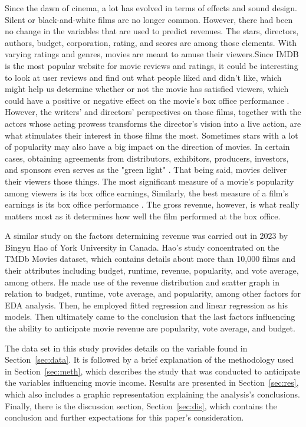 \documentclass[12pt]{article}
\begin{document}
Since the dawn of cinema, a lot has evolved in terms of effects and sound design. 
Silent or black-and-white films are no longer common. However, there had been no
change in the variables that are used to predict revenues. The stars, directors,
authors, budget, corporation, rating, and scores are among those elements. With 
varying ratings and genres, movies are meant to amuse their viewers.Since IMDB is the
most popular website for movie reviews and ratings, it could be interesting to look at 
user reviews and find out what people liked and didn't like, which might help us determine
whether or not the movie has satisfied viewers, which could have a positive or negative 
effect on the movie's box office performance \citep{3}. However, the writers' and directors' perspectives on
those films, together with the actors whose acting prowess transforms the director's vision 
into a live action, are what stimulates their interest in those films the most. Sometimes
stars with a lot of popularity may also have a big impact on the direction of movies. In certain cases,
obtaining agreements from distributors, exhibitors, producers, investors, and sponsors 
even serves as the "green light" \citep{2}. That being said, movies deliver their 
viewers those things. The most significant measure of a movie's popularity among viewers
is its box office earnings, Similarly, the best measure of a film's earnings is its box 
office performance \citep{1}. The gross revenue, however, is what really matters most as it 
determines how well the film performed at the box office.

A similar study on the factors determining revenue was carried out in 2023 by Bingyu Hao 
of York University in Canada. Hao's study concentrated on the TMDb Movies dataset, which 
contains details about more than 10,000 films and their attributes including budget, runtime, 
revenue, popularity, and vote average, among others. He made use of the revenue distribution 
and scatter graph in relation to budget, runtime, vote average, and popularity, among other 
factors for EDA analysis. Then, he employed fitted regression and linear regression as his models. Then ultimately
came to the conclusion that the last factors influencing the ability to anticipate movie revenue 
are popularity, vote average, and budget.

The data set in this study provides details on the variable found in Section~\ref{sec:data}.  
It is followed by a brief explanation of the methodology used in Section~\ref{sec:meth}, 
which describes the study that was conducted to anticipate the variables influencing movie 
income. Results are presented in Section~\ref{sec:res}, which also includes a graphic representation
explaining the analysis's conclusions. Finally, there is the discussion section, 
Section~\ref{sec:dis}, which contains the conclusion and further expectations for this
paper's consideration.
\end{document}
